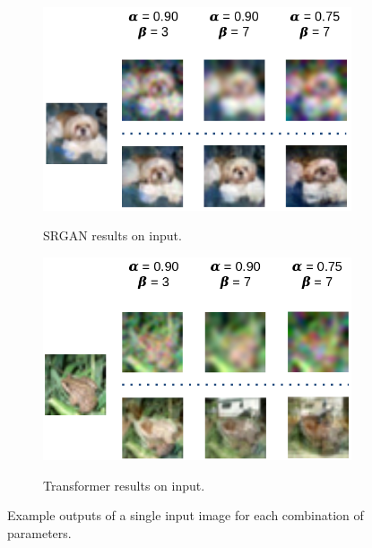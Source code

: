 \documentclass[letterpaper]{article} %
\begin{document}
\begin{figure}[h!]
\centering
\begin{subfigure}{0.45\textwidth}
\begin{center}
\begin{minipage}[t]{\linewidth}
\begin{centering}
{\includegraphics[width=\linewidth]{srgan_outputs.png}}
\caption{SRGAN results on input.}
\label{fig:srgan_outputs}
\end{centering}
\end{minipage}
\end{center}
\end{subfigure}
\begin{subfigure}{0.45\textwidth}
\begin{center}
\begin{minipage}[t]{\linewidth}
\begin{centering}
{\includegraphics[width=\linewidth]{attn_outputs_2.png}}
\caption{Transformer results on input.}
\label{fig:attn_outputs}
\end{centering}
\end{minipage}
\end{center}
\end{subfigure}
\caption{Example outputs of a single input image for each combination of parameters.}
\label{fig:example_outputs}
\end{figure}
\end{document}
